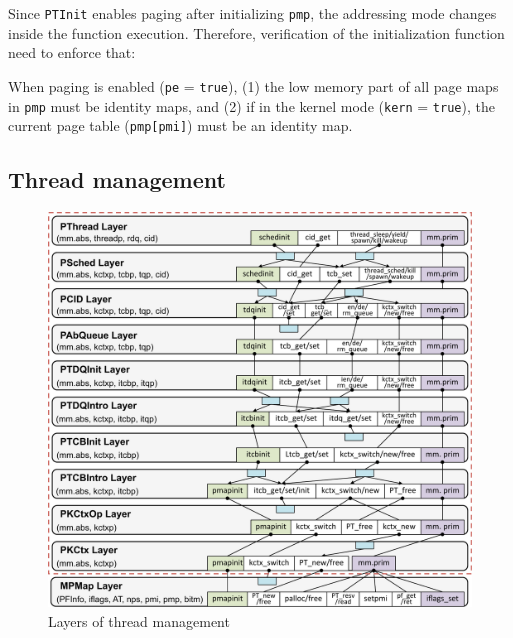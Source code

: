 {Since \verb"PTInit"  enables paging after initializing \verb"pmp", the addressing mode changes inside the function execution. Therefore, verification of the initialization function need to enforce that:
\begin{invariant}
\label{inv:pagemap}
When paging is enabled (\verb"pe" = \verb"true"),
(1) the low memory part of all page maps in \verb"pmp" must be identity maps, and
(2) if in the kernel mode (\verb"kern" = \verb"true"), the current page table (\verb"pmp[pmi]") must be an identity map.
\end{invariant}
}


\subsection{Thread management}
\label{sec:base:tm} 

{
\begin{figure}\centering
\includegraphics[scale=0.5]{figs/tm_layer}	
\caption{Layers of thread management}
\label{fig:base:tm:layers}
\hrulefill
\end{figure}
}

